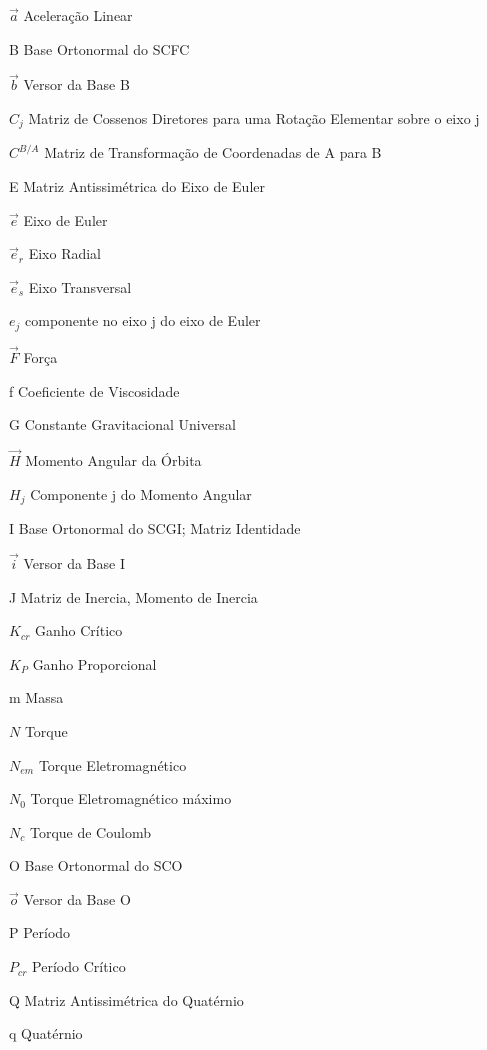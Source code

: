 \documentclass[
	12pt,					%
	openright,				%
	twoside,					%
	a4paper,					%
	english,					%
	brazil					%
	]{abntex2}
\numberwithin{equation}{subsection}
\begin{document}
\begin{simbolos}
	\item[$\vec{a}$] Aceleração Linear
    \item[B] Base Ortonormal do SCFC
    \item[$\vec{b}$] Versor da Base B
    \item[$C_j$] Matriz de Cossenos Diretores para uma Rotação Elementar sobre o eixo j 
    \item[$C^{B/A}$] Matriz de Transformação de Coordenadas de A para B 
    \item[E] Matriz Antissimétrica do Eixo de Euler
    \item[$\vec{e}$] Eixo de Euler
    \item[$\vec{e}_r$] Eixo Radial
    \item[$\vec{e}_s$] Eixo Transversal
    \item[$e_j$] componente no eixo j do eixo de Euler
    \item[$\vec{F}$] Força
    \item[f] Coeficiente de Viscosidade
    \item[G] Constante Gravitacional Universal
    \item[$\vec{H}$] Momento Angular da Órbita
    \item[$H_j$] Componente j do Momento Angular
    \item[I] Base Ortonormal do SCGI; Matriz Identidade
    \item[$\vec{i}$] Versor da Base I
    \item[J] Matriz de Inercia, Momento de Inercia
    \item[$K_{cr}$] Ganho Crítico
    \item[$K_P$] Ganho Proporcional
    \item[m] Massa
    \item[$N$] Torque
    \item[$N_{em}$] Torque Eletromagnético
    \item[$N_0$] Torque Eletromagnético máximo
    \item[$N_c$] Torque de Coulomb
    \item[O] Base Ortonormal do SCO
    \item[$\vec{o}$] Versor da Base O
    \item[P] Período
    \item[$P_{cr}$] Período Crítico
    \item[Q] Matriz Antissimétrica do Quatérnio
    \item[q] Quatérnio

\end{simbolos}
\end{document}

